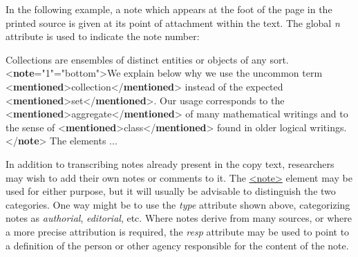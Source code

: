 In the following example, a note which appears at the foot of the page in the printed source is given at its point of attachment within the text. The global {\itshape n} attribute is used to indicate the note number: \par\bgroup{}\exampleFont \begin{shaded}\noindent\mbox{}Collections are ensembles of\mbox{}\newline 
 distinct entities or objects of any sort.{<\textbf{note}\hspace*{1em}{n}="{1}"\hspace*{1em}{place}="{bottom}">}We\mbox{}\newline 
 explain below why we use the uncommon term\mbox{}\newline 
{<\textbf{mentioned}>}collection{</\textbf{mentioned}>} instead of the expected\mbox{}\newline 
{<\textbf{mentioned}>}set{</\textbf{mentioned}>}. Our usage corresponds to the\mbox{}\newline 
{<\textbf{mentioned}>}aggregate{</\textbf{mentioned}>} of many mathematical writings and to\mbox{}\newline 
 the sense of {<\textbf{mentioned}>}class{</\textbf{mentioned}>} found in older logical\mbox{}\newline 
 writings.{</\textbf{note}>} The elements ...\end{shaded}\egroup\par \par
In addition to transcribing notes already present in the copy text, researchers may wish to add their own notes or comments to it. The \hyperref[TEI.note]{<note>} element may be used for either purpose, but it will usually be advisable to distinguish the two categories. One way might be to use the {\itshape type} attribute shown above, categorizing notes as \textit{authorial}, \textit{editorial}, etc. Where notes derive from many sources, or where a more precise attribution is required, the {\itshape resp} attribute may be used to point to a definition of the person or other agency responsible for the content of the note.\par
